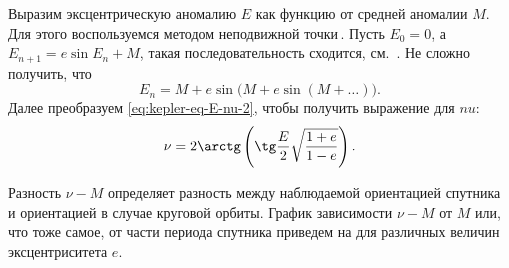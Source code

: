 Выразим эксцентрическую аномалию $E$ как функцию от средней аномалии $M$. Для этого воспользуемся методом неподвижной точки\,\cite{balk_dynamic_space_flight}. Пусть $E_0 = 0$, а $E_{n+1} = e \sin E_n + M$, такая последовательность сходится, см.~\cite{balk_dynamic_space_flight}. Не сложно  получить, что
\begin{equation*}
    E_n = M + e \sin \big( M + e \sin ( M + \ldots) \big).
\end{equation*}
Далее преобразуем \eqref{eq:kepler-eq-E-nu-2}, чтобы получить выражение для $nu$:
\begin{equation*}
    \nu = 2 \arctg \left( \tg \frac{E}{2} \sqrt{\frac{1 + e}{1 - e}} \right).
\end{equation*}

Разность $\nu - M$ определяет разность между наблюдаемой ориентацией спутника и ориентацией в случае круговой орбиты. График зависимости $\nu - M$ от $M$ или, что тоже самое, от части периода спутника приведем на  для различных величин эксцентриситета $e$.



